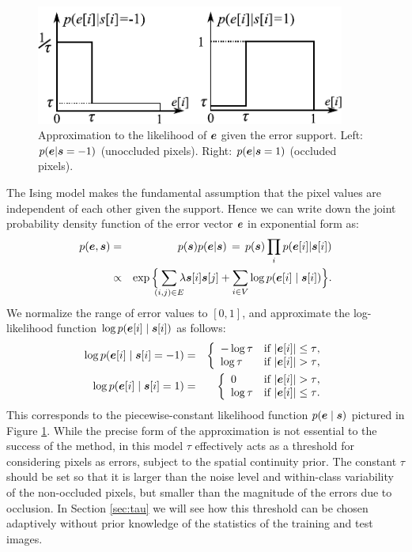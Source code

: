\begin{figure} 
\centerline{\includegraphics[width=4.0in]{figures_iccv/function.pdf}}
\caption{Approximation to the likelihood of $\boldsymbol{e}$ given the error support. Left: $p(\boldsymbol{e}|\boldsymbol{s} = -1)$ (unoccluded pixels). Right: $p(\boldsymbol{e}|\boldsymbol{s} = 1)$ (occluded pixels).} \label{fig:likelihood} \vspace{0mm}
\end{figure}

The Ising model makes the fundamental assumption that the pixel values are independent of each other given the support. Hence we can write down the joint probability density function of the error vector $\boldsymbol{e}$ in exponential form as:
\begin{eqnarray*}
p(\e,\s) &=& p(\s) p(\e|\s) \,=\, p(\s) \prod_i p(\e[i]|\s[i]) \\
&\propto&  \exp\Big\{\hspace{-2mm}\sum_{(i,j)\in E} \hspace{-2mm}\lambda\s[i]\s[j] +
\sum_{i\in V} \log p(\e[i] \mid \s[i]) \Big\}.
\end{eqnarray*}
We normalize the range of error values to $[0,1]$, and approximate the log-likelihood function $\log p(\boldsymbol{e}[i]\mid\boldsymbol{s}[i])$ as follows:
\begin{eqnarray*}
\log p(\boldsymbol{e}[i] \mid \boldsymbol{s}[i]=-1) &=& \left\{ \begin{array}{ll}
-\log \tau & \textrm{if $|\boldsymbol{e}[i]| \le \tau$},\\
\log \tau & \textrm{if $|\boldsymbol{e}[i]| >\tau$},
\end{array} \right. \\
\log p(\boldsymbol{e}[i] \mid \boldsymbol{s}[i]=1) &=& \left\{ \begin{array}{ll}
0 & \textrm{if $|\boldsymbol{e}[i]| > \tau$},\\
\log \tau & \textrm{if $|\boldsymbol{e}[i]| \le \tau$}.
\end{array} \right.
\end{eqnarray*}
This corresponds to the piecewise-constant likelihood function $p(\boldsymbol{e}\mid \boldsymbol{s})$ pictured in Figure \ref{fig:likelihood}. While the precise form of the approximation is not essential to the success of the method, in this model $\tau$ effectively acts as a threshold for considering pixels as errors, subject to the spatial continuity prior. The constant $\tau$ should be set so that it is larger than the noise level and within-class variability of the non-occluded pixels, but smaller than the magnitude of the errors due to occlusion.  In Section \ref{sec:tau} we will see how this threshold can be chosen adaptively without prior knowledge of the statistics of the training and test images.

